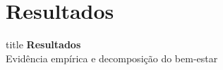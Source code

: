 
\section{Resultados}

\begin{frame}[plain]
    \vfill
    \centering
    \begin{beamercolorbox}[sep=12pt,center,shadow=false,rounded=true]{title}
        {\Large\bfseries Resultados}\\[6pt]
        {\normalsize Evidência empírica e decomposição do bem-estar}
    \end{beamercolorbox}
    \vfill
\end{frame}

